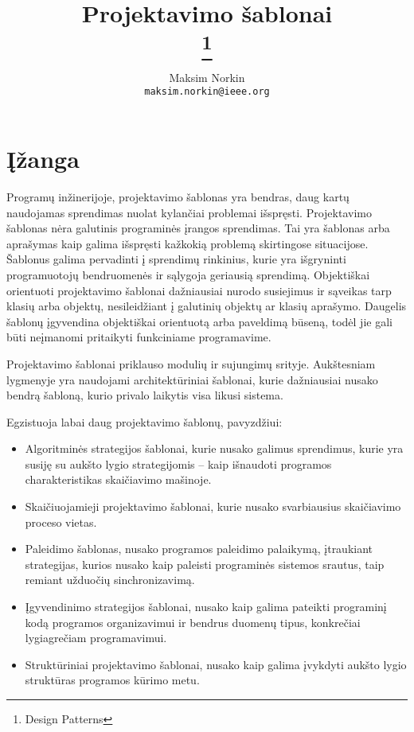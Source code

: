 \documentclass[10pt]{IEEEtran}
\author{Maksim Norkin\\ \texttt{maksim.norkin@ieee.org}}
\title{Projektavimo šablonai \\ \footnote{Design Patterns}}
\begin{document}
	\maketitle

	\section{Įžanga}

		Programų inžinerijoje, projektavimo šablonas yra bendras, daug kartų naudojamas sprendimas nuolat kylančiai problemai išspręsti. Projektavimo šablonas nėra galutinis programinės įrangos sprendimas. Tai yra šablonas arba aprašymas kaip galima išspręsti kažkokią problemą skirtingose situacijose. Šablonus galima pervadinti į sprendimų rinkinius, kurie yra išgryninti programuotojų bendruomenės ir sąlygoja geriausią sprendimą. Objektiškai orientuoti projektavimo šablonai dažniausiai nurodo susiejimus ir sąveikas tarp klasių arba objektų, nesileidžiant į galutinių objektų ar klasių aprašymo. Daugelis šablonų įgyvendina objektiškai orientuotą arba paveldimą būseną, todėl jie gali būti neįmanomi pritaikyti funkciniame programavime. 

		Projektavimo šablonai priklauso modulių ir sujungimų srityje. Aukštesniam lygmenyje yra naudojami architektūriniai šablonai, kurie dažniausiai nusako bendrą šabloną, kurio privalo laikytis visa likusi sistema.

		Egzistuoja labai daug projektavimo šablonų, pavyzdžiui:

		\begin{itemize}
			\item Algoritminės strategijos šablonai, kurie nusako galimus sprendimus, kurie yra susiję su aukšto lygio strategijomis -- kaip išnaudoti programos charakteristikas skaičiavimo mašinoje.
			\item Skaičiuojamieji projektavimo šablonai, kurie nusako svarbiausius skaičiavimo proceso vietas.
			\item Paleidimo šablonas, nusako programos paleidimo palaikymą, įtraukiant strategijas, kurios nusako kaip paleisti programinės sistemos srautus, taip remiant užduočių sinchronizavimą.
			\item Įgyvendinimo strategijos šablonai, nusako kaip galima pateikti programinį kodą programos organizavimui ir bendrus duomenų tipus, konkrečiai lygiagrečiam programavimui.
			\item Struktūriniai projektavimo šablonai, nusako kaip galima įvykdyti aukšto lygio struktūras programos kūrimo metu.
		\end{itemize}
\end{document}
